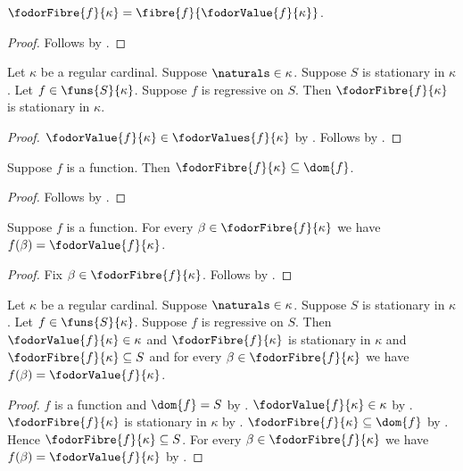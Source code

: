 \begin{proposition}\label{fodor_fibre_eq}
    $\fodorFibre{f}{\kappa}
        =\fibre{f}{\fodorValue{f}{\kappa}}$.
\end{proposition}
\begin{proof}
    Follows by .
\end{proof}

\begin{proposition}\label{fodor_fibre_stationary}
    Let $\kappa$ be a regular cardinal.
    Suppose $\naturals\in\kappa$.
    Suppose $S$ is stationary in $\kappa$.
    Let $f\in\funs{S}{\kappa}$.
    Suppose $f$ is regressive on $S$.
    Then $\fodorFibre{f}{\kappa}$ is stationary in $\kappa$.
\end{proposition}
\begin{proof}
    $\fodorValue{f}{\kappa}\in\fodorValues{f}{\kappa}$
        by .
    Follows by .
\end{proof}

\begin{proposition}\label{fodor_fibre_subset_domain}
    Suppose $f$ is a function.
    Then $\fodorFibre{f}{\kappa}\subseteq\dom{f}$.
\end{proposition}
\begin{proof}
    Follows by .
\end{proof}

\begin{proposition}\label{fodor_fibre_constant}
    Suppose $f$ is a function.
    For every $\beta\in\fodorFibre{f}{\kappa}$ we have
        $f(\beta)=\fodorValue{f}{\kappa}$.
\end{proposition}
\begin{proof}
    Fix $\beta\in\fodorFibre{f}{\kappa}$.
    Follows by .
\end{proof}

\begin{theorem}\label{fodor_value_and_fibre_properties}
    Let $\kappa$ be a regular cardinal.
    Suppose $\naturals\in\kappa$.
    Suppose $S$ is stationary in $\kappa$.
    Let $f\in\funs{S}{\kappa}$.
    Suppose $f$ is regressive on $S$.
    Then $\fodorValue{f}{\kappa}\in\kappa$ and
        $\fodorFibre{f}{\kappa}$ is stationary in $\kappa$ and
        $\fodorFibre{f}{\kappa}\subseteq S$ and
        for every $\beta\in\fodorFibre{f}{\kappa}$ we have
            $f(\beta)=\fodorValue{f}{\kappa}$.
\end{theorem}
\begin{proof}
    $f$ is a function and $\dom{f}=S$
        by .
    $\fodorValue{f}{\kappa}\in\kappa$ by .
    $\fodorFibre{f}{\kappa}$ is stationary in $\kappa$
        by .
    $\fodorFibre{f}{\kappa}\subseteq\dom{f}$
        by .
    Hence $\fodorFibre{f}{\kappa}\subseteq S$.
    For every $\beta\in\fodorFibre{f}{\kappa}$ we have
        $f(\beta)=\fodorValue{f}{\kappa}$
        by .
\end{proof}
